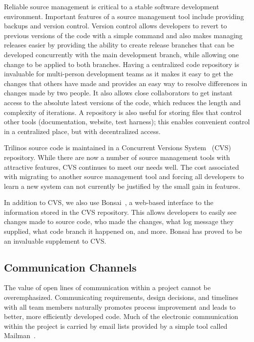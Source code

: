\documentclass[times,10pt,twocolumn]{article}
\begin{document}
Reliable source management is critical to a stable software
development environment.  Important features of a source management
tool include providing backups and version control.  Version control
allows developers to revert to previous versions of the code with a
simple command and also makes managing releases easier by providing
the ability to create release branches that can be developed
concurrently with the main development branch, while allowing one
change to be applied to both branches.  Having a centralized code
repository is invaluable for multi-person development teams as it
makes it easy to get the changes that others have made and provides
an easy way to resolve differences in changes made by two people. It
also allows close collaborators to get instant access to the
absolute latest versions of the code, which reduces the length and
complexity of iterations.  A repository is also useful for storing
files that control other tools (documentation, website, test
harness); this enables convenient control in a centralized place,
but with decentralized access.

Trilinos source code is maintained in a Concurrent Versions
System~\cite{CVS} (CVS) repository.  While there are now a number of
source management tools with attractive features, CVS continues to
meet our needs well.  The cost associated with migrating to another
source management tool and forcing all developers to learn a new
system can not currently be justified by the small gain in features.

In addition to CVS, we also use Bonsai~\cite{Bonsai}, a web-based
interface to the information stored in the CVS repository.  This
allows developers to easily see changes made to source code, who
made the changes, what log message they supplied, what code branch
it happened on, and more.  Bonsai has proved to be an invaluable
supplement to CVS.

\subsection{Communication Channels}


The value of open lines of communication within a project cannot be
overemphasized.  Communicating requirements, design decisions, and
timelines with all team members naturally promotes process
improvement and leads to better, more efficiently developed code.
Much of the electronic communication within the project is carried
by email lists provided by a simple tool called
Mailman~\cite{Mailman}.
\end{document}
